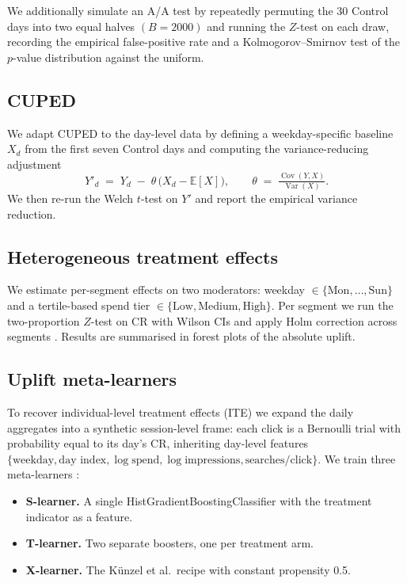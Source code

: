\documentclass[pdflatex,sn-mathphys-num]{sn-jnl}
\theoremstyle{thmstyleone}
\theoremstyle{thmstyletwo}
\theoremstyle{thmstylethree}
\begin{document}
We additionally simulate an A/A test by repeatedly permuting the 30 Control days
into two equal halves $(B=2000)$ and running the $Z$-test on each draw,
recording the empirical false-positive rate and a Kolmogorov--Smirnov test
of the $p$-value distribution against the uniform.

\subsection{CUPED}\label{subsec:methods-cuped}

We adapt CUPED \cite{deng2013improving} to the day-level data by defining a
weekday-specific baseline $X_{d}$ from the first seven Control days
and computing the variance-reducing adjustment
\begin{equation}
Y'_{d} \;=\; Y_{d} \;-\; \theta\,\big(X_{d}-\mathbb{E}[X]\big), \qquad
\theta \;=\; \tfrac{\operatorname{Cov}(Y,X)}{\operatorname{Var}(X)}.
\end{equation}
We then re-run the Welch $t$-test on $Y'$ and report the empirical variance reduction.

\subsection{Heterogeneous treatment effects}\label{subsec:methods-hte}

We estimate per-segment effects on two moderators:
weekday $\in\{\text{Mon},\ldots,\text{Sun}\}$ and a tertile-based spend tier
$\in\{\text{Low}, \text{Medium}, \text{High}\}$. Per segment we run the
two-proportion $Z$-test on CR with Wilson CIs and apply Holm correction across segments
\cite{yu2018false}. Results are summarised in forest plots of the absolute uplift.

\subsection{Uplift meta-learners}\label{subsec:methods-uplift}

To recover individual-level treatment effects (ITE) we expand the daily aggregates into
a synthetic session-level frame: each click is a Bernoulli trial with probability
equal to its day's CR, inheriting day-level features
$\{\text{weekday}, \text{day index}, \log\text{spend}, \log\text{impressions}, \text{searches/click}\}$.
We train three meta-learners \cite{athey2019machine,devriendt2018literature}:

\begin{itemize}
\item \textbf{S-learner.} A single HistGradientBoostingClassifier with the treatment indicator as a feature.
\item \textbf{T-learner.} Two separate boosters, one per treatment arm.
\item \textbf{X-learner.} The Künzel et al.\ recipe with constant propensity 0.5.
\end{itemize}
\end{document}
